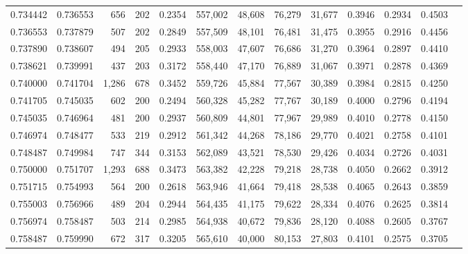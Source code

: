 \begin{tabular}{rrrrrrrrrrrrr}
0.734442 & 0.736553 &   656 & 202 &                                     0.2354 & 557,002 &  48,608 &  76,279 &  31,677 & 0.3946 & 0.2934 & 0.4503 \\
0.736553 & 0.737879 &   507 & 202 &                                     0.2849 & 557,509 &  48,101 &  76,481 &  31,475 & 0.3955 & 0.2916 & 0.4456 \\
0.737890 & 0.738607 &   494 & 205 &                                     0.2933 & 558,003 &  47,607 &  76,686 &  31,270 & 0.3964 & 0.2897 & 0.4410 \\
0.738621 & 0.739991 &   437 & 203 &                                     0.3172 & 558,440 &  47,170 &  76,889 &  31,067 & 0.3971 & 0.2878 & 0.4369 \\
0.740000 & 0.741704 & 1,286 & 678 &                                     0.3452 & 559,726 &  45,884 &  77,567 &  30,389 & 0.3984 & 0.2815 & 0.4250 \\
0.741705 & 0.745035 &   602 & 200 &                                     0.2494 & 560,328 &  45,282 &  77,767 &  30,189 & 0.4000 & 0.2796 & 0.4194 \\
0.745035 & 0.746964 &   481 & 200 &                                     0.2937 & 560,809 &  44,801 &  77,967 &  29,989 & 0.4010 & 0.2778 & 0.4150 \\
0.746974 & 0.748477 &   533 & 219 &                                     0.2912 & 561,342 &  44,268 &  78,186 &  29,770 & 0.4021 & 0.2758 & 0.4101 \\
0.748487 & 0.749984 &   747 & 344 &                                     0.3153 & 562,089 &  43,521 &  78,530 &  29,426 & 0.4034 & 0.2726 & 0.4031 \\
0.750000 & 0.751707 & 1,293 & 688 &                                     0.3473 & 563,382 &  42,228 &  79,218 &  28,738 & 0.4050 & 0.2662 & 0.3912 \\
0.751715 & 0.754993 &   564 & 200 &                                     0.2618 & 563,946 &  41,664 &  79,418 &  28,538 & 0.4065 & 0.2643 & 0.3859 \\
0.755003 & 0.756966 &   489 & 204 &                                     0.2944 & 564,435 &  41,175 &  79,622 &  28,334 & 0.4076 & 0.2625 & 0.3814 \\
0.756974 & 0.758487 &   503 & 214 &                                     0.2985 & 564,938 &  40,672 &  79,836 &  28,120 & 0.4088 & 0.2605 & 0.3767 \\
0.758487 & 0.759990 &   672 & 317 &                                     0.3205 & 565,610 &  40,000 &  80,153 &  27,803 & 0.4101 & 0.2575 & 0.3705 \\

\end{tabular}
